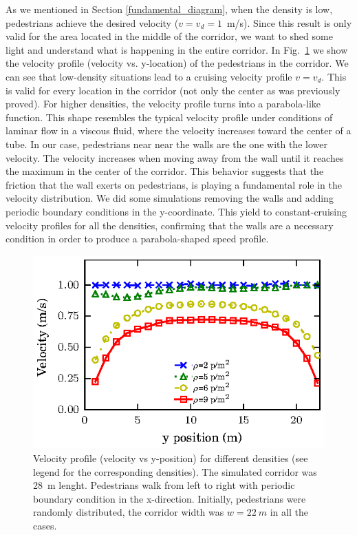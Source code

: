  As we mentioned in Section \ref{fundamental_diagram}, when the density is low, pedestrians achieve the desired velocity ($v=v_d=1$~m/s). Since this result is only valid for the area located in the middle of the corridor, we want to shed some light and understand what is happening in the entire corridor. In Fig.~\ref{speed-profile-w22} we show the velocity profile (velocity vs. y-location) of the pedestrians in the  corridor. We can see that low-density situations lead to a cruising velocity profile $v=v_d$. This is valid for every location in the corridor (not only the center as was previously proved). For higher densities, the velocity profile turns into a parabola-like function. This shape resembles the typical velocity profile under conditions of laminar flow in a viscous fluid, where the velocity increases toward the center of a tube. In our case, pedestrians near near the walls are the one with the lower velocity. The velocity increases when moving away from the wall until it reaches the maximum in the center of the corridor. This behavior suggests that the friction that the wall exerts on pedestrians, is playing a fundamental role in the velocity distribution. We did some simulations removing the walls and adding periodic boundary conditions in the y-coordinate. This yield to constant-cruising velocity profiles for all the densities, confirming that the walls are a necessary condition in order to produce a parabola-shaped speed profile.

\begin{figure}[htbp!]
\includegraphics[width=\columnwidth]
{plots/v(y)_width22_k24.eps}
\caption{\label{speed-profile-w22} Velocity profile (velocity vs y-position) for different densities (see legend for the corresponding densities). The simulated corridor was 28~m lenght. Pedestrians walk from left to right with periodic boundary condition in the x-direction. Initially, pedestrians were randomly distributed, the corridor width was $w = 22~m$ in all the cases. }
\end{figure}

